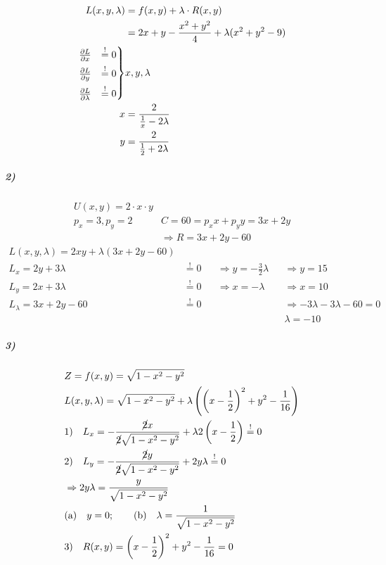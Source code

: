 \begin{align*}
    L(x, y, \lambda) &= f(x, y) + \lambda \cdot R(x, y) \\
    &= 2x + y - \frac{x^2 + y^2}{4} + \lambda(x^2 + y^2 - 9) \\
    \begin{rcases}
        \frac{\partial L}{\partial x} &\overset{!}{=} 0 \\
        \frac{\partial L}{\partial y} &\overset{!}{=} 0 \\
        \frac{\partial L}{\partial \lambda} &\overset{!}{=} 0
    \end{rcases}
    &x, y, \lambda \\
    x &= \frac{2}{\frac{1}{x} - 2 \lambda} \\
    y &= \frac{2}{\frac{1}{2} + 2 \lambda}
\end{align*}

\subparagraph{2)}

\begin{align*}
    U(x, y) = 2 \cdot x \cdot y \\
    p_x = 3, p_y = 2 \qquad &C = 60 = p_x x + p_y y = 3x + 2y \\
    &\Rightarrow R = 3x + 2y - 60
\end{align*}
\begin{align*}
    L(x, y, \lambda) = 2xy + \lambda (3x + 2y - 60) \\
    L_x = 2 y + 3 \lambda &\overset{!}{=} 0 &&\Rightarrow y = - \frac{3}{2} \lambda &&\Rightarrow y = 15 \\
    L_y = 2 x + 3 \lambda &\overset{!}{=} 0 &&\Rightarrow x = - \lambda  &&\Rightarrow x = 10 \\
    L_\lambda = 3 x + 2 y - 60 &\overset{!}{=} 0 && &&\Rightarrow - 3 \lambda - 3 \lambda - 60 = 0 \\
    & && &&\lambda = -10
\end{align*}


\subparagraph{3)}

\begin{align*}
    & Z = f(x, y) = \sqrt{1 - x^2 - y^2} \\
    & L(x, y, \lambda) = \sqrt{1 - x^2 - y^2} + \lambda \left( \left( x - \frac{1}{2} \right)^2 + y^2 - \frac{1}{16} \right) \\
    &1)\quad L_x = - \frac{\cancel{2} x}{\cancel{2} \sqrt{1 - x^2 - y^2}} + \lambda 2 \left( x - \frac{1}{2} \right) \overset{!}{=} 0 \\
    &2)\quad L_y = - \frac{\cancel{2} y}{\cancel{2} \sqrt{1 - x^2 - y^2}} + 2 y \lambda \overset{!}{=} 0 \\
    & \Rightarrow 2 y \lambda = \frac{y}{\sqrt{1 - x^2 - y^2}} \\
    & \text{(a)} \quad y = 0;\qquad \text{(b)} \quad \lambda = \frac{1}{\sqrt{1 - x^2 - y^2}} \\
    &3)\quad R(x, y) = \left( x - \frac{1}{2} \right)^2 + y^2 - \frac{1}{16} = 0
\end{align*}

